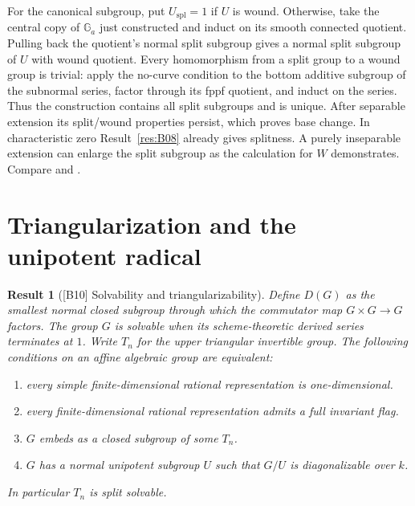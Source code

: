 \documentclass[11pt,a4paper,openany,oneside]{book}
\theoremstyle{resultstyle}
\newtheorem{statement}{Result}[chapter]
\newenvironment{result}[2]{\clubpenalty=10000\begin{statement}[\textnormal{[#1]} #2]\leavevmode\label{res:#1}\ignorespaces}{\end{statement}}
\theoremstyle{definition}
\numberwithin{equation}{chapter}
\begin{document}
For the canonical subgroup, put \(U_{\mathrm{spl}}=1\) if \(U\)
is wound. Otherwise, take the central copy of \(\mathbb G_a\)
just constructed and induct on its smooth connected quotient.
Pulling back the quotient's normal split subgroup gives a
normal split subgroup of \(U\) with wound quotient. Every
homomorphism from a split group to a wound group is trivial:
apply the no-curve condition to the bottom additive subgroup
of the subnormal series, factor through its fppf quotient, and
induct on the series. Thus the construction contains all split
subgroups and is unique. After separable extension its
split/wound properties persist, which proves base change. In
characteristic zero Result~\ref{res:B08} already gives splitness.
A purely inseparable extension can enlarge the split subgroup
as the calculation for \(W\) demonstrates. Compare
\cite[Appendix B, Proposition B.3.4]{cgp} and
\cite[the paragraph after Proposition 5.2.10]{conradfeng}.

\section{Triangularization and the unipotent radical}

\begin{result}{B10}{Solvability and triangularizability}
Define \(D(G)\) as the smallest normal closed subgroup through which
the commutator map \(G\times G\to G\) factors. The group \(G\) is
solvable when its scheme-theoretic derived series terminates at \(1\).
Write \(T_n\) for the upper triangular invertible group. The following
conditions on an affine algebraic group are equivalent:
\begin{enumerate}
\item every simple finite-dimensional rational representation is
one-dimensional.
\item every finite-dimensional rational representation admits a full invariant flag.
\item \(G\) embeds as a closed subgroup of some \(T_n\).
\item \(G\) has a normal unipotent subgroup \(U\) such that \(G/U\)
is diagonalizable over \(k\).
\end{enumerate}
In particular \(T_n\) is split solvable.
\end{result}
\end{document}
